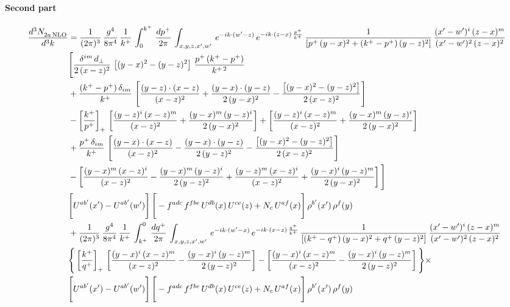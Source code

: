 \documentclass[9pt]{article}
\numberwithin{equation}{section}
\begin{document}
\paragraph{Second part}
\begin{align}
    \frac{d^{3}N_{2a\,\rm NLO}^{\rm}}{d^{3}k}  & =  \frac{1}{(2\pi)^{3}}\, \frac{g^{4}}{8\pi^{4}}\,\frac{1}{k^{+}}\,\int_{0}^{k^{+}}\, \frac{dp^{+}}{2\pi}\,\int_{x,y,z,x',w'}\, e^{-ik\cdot(w'-z)}\,e^{-ik\cdot (z-x)\,\frac{p^{+}}{k^{+}}}\,\frac{1}{\left[p^{+}\,(y-x)^{2}+(k^{+}-p^{+})\,(y-z)^{2}\right]}\, \frac{(x'-w')^{i}\,(z-x)^{m}}{(x'-w')^{2}\,(z-x)^{2}} \notag \\ & \Bigg[\frac{\delta^{im}\,d_{\perp}}{2\,(x-z)^{2}}\,\left[(y-x)^{2}-(y-z)^{2}\right]\,\frac{p^{+}\,(k^{+}-p^{+})}{k^{+\,2}}\notag \\ & +\frac{(k^{+}-p^{+})\,\delta_{im}}{k^{+}}\,\left[\frac{(y-z)\cdot (x-z)}{(x-z)^{2}}+\frac{(y-x)\cdot (y-z)}{2\,(y-x)^{2}}-\frac{\left[(y-x)^{2}-(y-z)^{2}\right]}{2\,(x-z)^{2}}\right]\notag \\ & -\left[\frac{k^{+}}{p^{+}}\right]_{+}\,\left[\frac{(y-z)^{i}\,(x-z)^{m}}{(x-z)^{2}}+\frac{(y-x)^{m}\,(y-z)^{i}}{2\,(y-x)^{2}}\right]+ \left[\frac{(y-z)^{i}\,(x-z)^{m}}{(x-z)^{2}}+\frac{(y-x)^{m}\,(y-z)^{i}}{2\,(y-x)^{2}}\right]\notag \\ & +\frac{p^{+}\,\delta_{im}}{k^{+}}\,\left[\frac{(y-x)\cdot (x-z)}{(x-z)^{2}}-\frac{(y-x)\cdot (y-z)}{2\,(y-z)^{2}}-\frac{\left[(y-x)^{2}-(y-z)^{2}\right]}{2\,(x-z)^{2}}\right]\notag \\ &-\left[\frac{(y-x)^{m}\,(x-z)^{i}}{(x-z)^{2}}-\frac{(y-x)^{m}\,(y-z)^{i}}{2\,(y-z)^{2}}+\frac{(y-z)^{m}\,(x-z)^{i}}{(x-z)^{2}}+\frac{(y-x)^{i}\,(y-z)^{m}}{2\,(y-x)^{2}}\right]\Bigg] \notag \\ & \Bigg[U^{ab'}(x')-U^{ab'}(w')\Bigg]\,\Bigg[-f^{adc}\,f^{fbe}\,U^{db}(x)\,U^{ce}(z)+N_{c}\,U^{af}(x)\Bigg]\,\rho^{b'}(x')\,\rho^{f}(y)\notag \\ & + \frac{1}{(2\pi)^{3}}\,\frac{g^{4}}{8\pi^{4}}\,\frac{1}{k^{+}}\, \int^{0}_{k^{+}}\, \frac{dq^{+}}{2\pi} \,  \int_{x,y,z,x',w'}\,e^{-ik\cdot(w'-x)}\,e^{-ik\cdot (x-z)\,\frac{q^{+}}{k^{+}}}\,\frac{1}{\left[(k^{+}-q^{+})\,(y-x)^{2}+q^{+}\,(y-z)^{2}\right]}\, \frac{(x'-w')^{i}\,(z-x)^{m}}{(x'-w')^{2}\,(z-x)^{2}} \notag \\ &\Bigg\{\left[\frac{k^{+}}{q^{+}}\right]_{+}\,\left[\frac{(y-x)^{i}\,(x-z)^{m}}{(x-z)^{2}}-\frac{(y-x)^{i}\,(y-z)^{m}}{2\,(y-z)^{2}}\right] -\left[\frac{(y-x)^{i}\,(x-z)^{m}}{(x-z)^{2}}-\frac{(y-x)^{i}\,(y-z)^{m}}{2\,(y-z)^{2}}\right]\Bigg\}\times\,\notag \\ & \Bigg[U^{ab'}(x')-U^{ab'}(w')\Bigg]\,\Bigg[-f^{adc}\,f^{fbe}\,U^{db}(x)\,U^{ce}(z)+N_{c}\,U^{af}(x)\Bigg]\,\rho^{b'}(x')\,\rho^{f}(y)
\end{align} 
\end{document}
